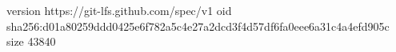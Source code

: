 version https://git-lfs.github.com/spec/v1
oid sha256:d01a80259ddd0425e6f782a5c4e27a2dcd3f4d57df6fa0eee6a31c4a4efd905c
size 43840
